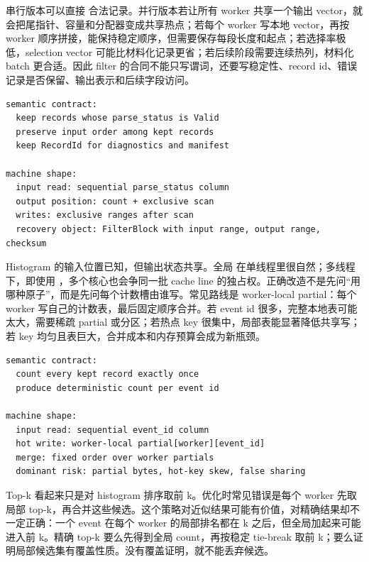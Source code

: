串行版本可以直接  合法记录。并行版本若让所有 worker 共享一个输出 vector，就会把尾指针、容量和分配器变成共享热点；若每个 worker 写本地 vector，再按 worker 顺序拼接，能保持稳定顺序，但需要保存每段长度和起点；若选择率极低，selection vector 可能比材料化记录更省；若后续阶段需要连续热列，材料化 batch 更合适。因此 filter 的合同不能只写谓词，还要写稳定性、record id、错误记录是否保留、输出表示和后续字段访问。

\begin{lstlisting}[numbers=none,caption={valid filter 的合同和机器形状}]
semantic contract:
  keep records whose parse_status is Valid
  preserve input order among kept records
  keep RecordId for diagnostics and manifest

machine shape:
  input read: sequential parse_status column
  output position: count + exclusive scan
  writes: exclusive ranges after scan
  recovery object: FilterBlock with input range, output range, checksum
\end{lstlisting}

Histogram 的输入位置已知，但输出状态共享。全局  在单线程里很自然；多线程下，即使用 ，多个核心也会争同一批 cache line 的独占权。正确改造不是先问“用哪种原子”，而是先问每个计数槽由谁写。常见路线是 worker-local partial：每个 worker 写自己的计数表，最后固定顺序合并。若 event id 很多，完整本地表可能太大，需要稀疏 partial 或分区；若热点 key 很集中，局部表能显著降低共享写；若 key 均匀且表巨大，合并成本和内存预算会成为新瓶颈。

\begin{lstlisting}[numbers=none,caption={histogram 的合同和机器形状}]
semantic contract:
  count every kept record exactly once
  produce deterministic count per event id

machine shape:
  input read: sequential event_id column
  hot write: worker-local partial[worker][event_id]
  merge: fixed order over worker partials
  dominant risk: partial bytes, hot-key skew, false sharing
\end{lstlisting}

Top-k 看起来只是对 histogram 排序取前 k。优化时常见错误是每个 worker 先取局部 top-k，再合并这些候选。这个策略对近似结果可能有价值，对精确结果却不一定正确：一个 event 在每个 worker 的局部排名都在 k 之后，但全局加起来可能进入前 k。精确 top-k 要么先得到全局 count，再按稳定 tie-break 取前 k；要么证明局部候选集有覆盖性质。没有覆盖证明，就不能丢弃候选。

